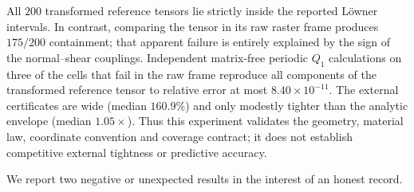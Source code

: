 \begin{table}[t]
\centering
\caption{Fixed external plane-strain coverage audit on DaRUS-5730. Training
uses no reference stiffness tensor. Margins are the smallest eigenvalues of
$C_{\rm ref}-C_{\rm low}$ and $C_{\rm up}-C_{\rm ref}$ in the common
Cartesian Mandel frame.}
\label{tab:external-elasticity}
\end{table}

All $200$ transformed reference tensors lie strictly inside the reported
L\"owner intervals. In contrast, comparing the tensor in its raw raster
frame produces $175/200$ containment; that apparent failure is entirely
explained by the sign of the normal--shear couplings. Independent
matrix-free periodic $Q_1$ calculations on three of the cells that fail in
the raw frame reproduce all components of the transformed reference tensor
to relative error at most $8.40\times10^{-11}$. The external certificates
are wide (median $160.9\%$) and only modestly tighter than the analytic
envelope (median $1.05\times$). Thus this experiment validates the
geometry, material law, coordinate convention and coverage contract; it
does not establish competitive external tightness or predictive accuracy.

We report two negative or unexpected results in the interest of an honest
record.

